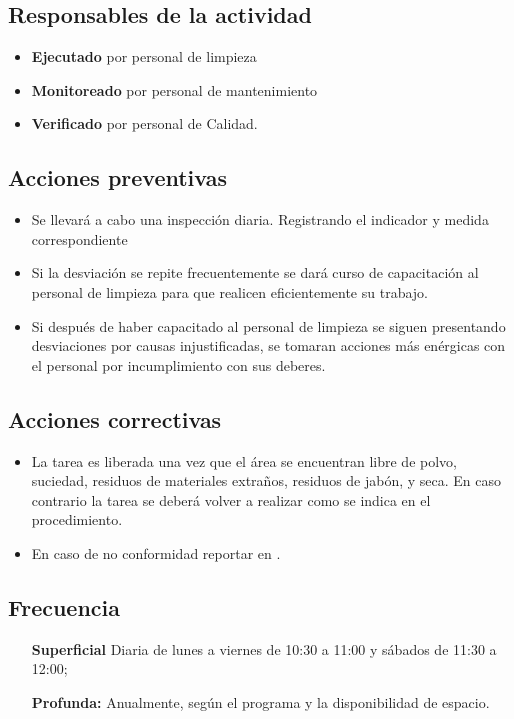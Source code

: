 \subsection{Responsables de la actividad}
\begin{itemize}
	\item \textbf{Ejecutado} por personal de limpieza
	\item \textbf{Monitoreado} por personal de mantenimiento
	\item \textbf{Verificado} por personal de Calidad.
\end{itemize}

\subsection{Acciones preventivas}

\begin{itemize}
	\item Se llevará a cabo una inspección diaria. Registrando el indicador y medida correspondiente
	\item Si la desviación se repite frecuentemente se dará curso de capacitación al personal de limpieza para que realicen eficientemente su trabajo.
	\item Si después de haber capacitado al personal de limpieza se siguen presentando desviaciones por causas injustificadas, se tomaran acciones más enérgicas con el personal por incumplimiento con sus deberes.
\end{itemize}

\subsection{Acciones correctivas}

\begin{itemize}
	\item La tarea es liberada una vez que el área se encuentran libre de polvo, suciedad, residuos de materiales extraños, residuos de jabón, y seca. En caso contrario la tarea se deberá volver a realizar como se indica en el procedimiento.
	\item En caso de no conformidad reportar en \RAC.
\end{itemize}

\subsection{Frecuencia}

\begin{itemize}
	\item[\textbf{Superficial}] Diaria de lunes a viernes de 10:30 a 11:00 y sábados de 11:30 a 12:00;
	\item[\textbf{Profunda:}] Anualmente, según el programa y la disponibilidad de espacio.
\end{itemize}

